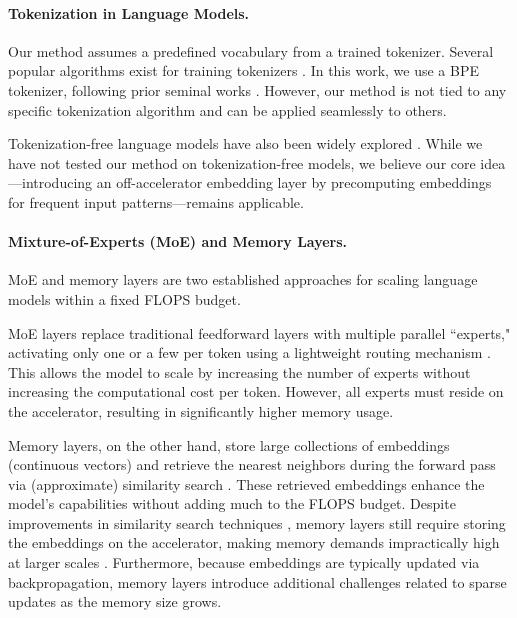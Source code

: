\paragraph{Tokenization in Language Models.} Our method assumes a predefined vocabulary from a trained tokenizer. Several popular algorithms exist for training tokenizers \citep{sennrich2015neural, wu2016google, kudo2018subword, kudo2018sentencepiece}. In this work, we use a BPE tokenizer, following prior seminal works \citep{radford2019language, touvron2023llama}. However, our method is not tied to any specific tokenization algorithm and can be applied seamlessly to others.

Tokenization-free language models have also been widely explored \citep{kim2016character, choe2019bridging, xue2022byt5, yu2023megabyte, wang2024mambabyte, deiseroth2024t, meta2024large, pagnoni2024byte}. While we have not tested our method on tokenization-free models, we believe our core idea—introducing an off-accelerator embedding layer by precomputing embeddings for frequent input patterns—remains applicable.



\paragraph{Mixture-of-Experts (MoE) and Memory Layers.} MoE and memory layers are two established approaches for scaling language models within a fixed FLOPS budget.

MoE layers replace traditional feedforward layers with multiple parallel ``experts," activating only one or a few per token using a lightweight routing mechanism \citep{shazeer2017outrageously,lepikhin2021gshard,fedus2022switch,jiang2024mixtral,he2024mixture}. This allows the model to scale by increasing the number of experts without increasing the computational cost per token. However, all experts must reside on the accelerator, resulting in significantly higher memory usage.

Memory layers, on the other hand, store large collections of embeddings (continuous vectors) and retrieve the nearest neighbors during the forward pass via (approximate) similarity search \citep{weston2014memory,sukhbaatar2015end,lample2019large,berges2024memory}. These retrieved embeddings enhance the model’s capabilities without adding much to the FLOPS budget. Despite improvements in similarity search techniques \citep{lample2019large,johnson2019billion}, memory layers still require storing the embeddings on the accelerator, making memory demands impractically high at larger scales \citep{berges2024memory}. Furthermore, because embeddings are typically updated via backpropagation, memory layers introduce additional challenges related to sparse updates as the memory size grows.

